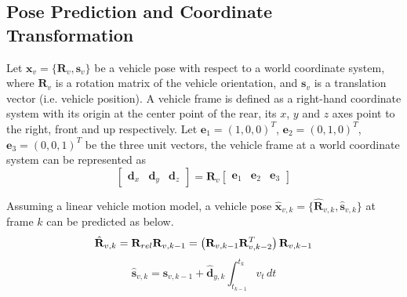 \documentclass[letterpaper, 10 pt, conference]{ieeeconf}  %
\begin{document}
%

\subsection{Pose Prediction and Coordinate Transformation}
Let $\mathbf{x}_{v} = \{\mathbf{R}_{v}, \mathbf{s}_{v}\}$ be a vehicle pose with respect to a world coordinate system, where $\mathbf{R}_{v}$ is a rotation matrix of the vehicle orientation, and $\mathbf{s}_{v}$ is a translation vector (i.e. vehicle position).
A vehicle frame is defined as a right-hand coordinate system with its origin at the center point of the rear, its $x$, $y$ and $z$ axes point to the right, front and up respectively. Let $\mathbf{e}_1=(1,0,0)^T$, $\mathbf{e}_2=(0,1,0)^T$, $\mathbf{e}_3=(0,0,1)^T$ be the three unit vectors, the vehicle frame at a world coordinate system can be represented as
\begin{equation}
\begin{bmatrix} \mathbf{d}_x & \mathbf{d}_y & \mathbf{d}_z \end{bmatrix}
= \mathbf{R}_v
\begin{bmatrix} \mathbf{e}_1 & \mathbf{e}_2 & \mathbf{e}_3 \end{bmatrix}
\end{equation}

Assuming a linear vehicle motion model, a vehicle pose $\hat{\mathbf{x}}_{v,k}=\{\hat{\mathbf{R}}_{v,k},\hat{\mathbf{s}}_{v,k}\}$ at frame $k$ can be predicted as below.
\begin{equation}
\hat{\mathbf{R}}_{v,k}=\mathbf{R}_{rel}\mathbf{R}_{v,k-1}=\left(\mathbf{R}_{v,k-1}\mathbf{R}_{v,k-2}^T\right)\mathbf{R}_{v,k-1}\\
\label{eq:R_t_predict}
\end{equation}
\begin{equation}
\hat{\mathbf{s}}_{v,k}= \mathbf{s}_{v,k-1} + \hat{\mathbf{d}}_{y,k} \int_{t_{k-1}}^{t_k}{v_t}\,dt
\end{equation}
\end{document}

